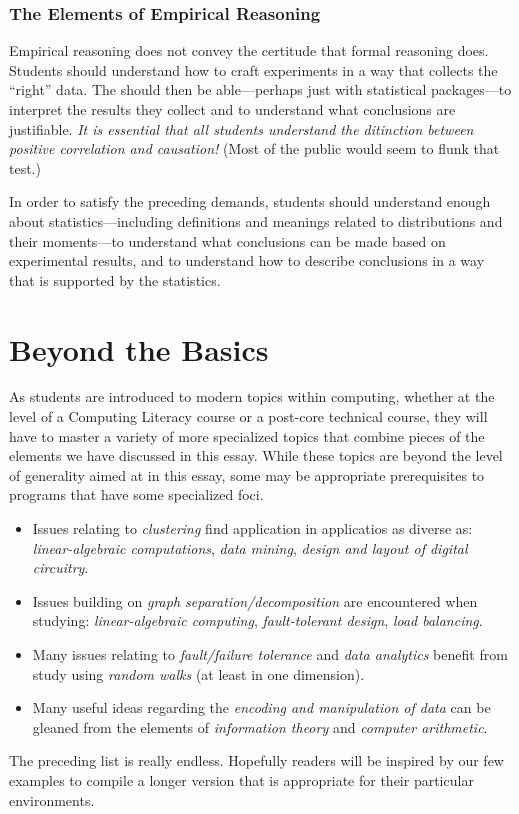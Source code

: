 \subsubsection{The Elements of Empirical Reasoning}

Empirical reasoning does not convey the certitude that formal
reasoning does.  Students should understand how to craft experiments
in a way that collects the ``right'' data.  The should then be
able---perhaps just with statistical packages---to interpret the
results they collect and to understand what conclusions are
justifiable.  {\em It is essential that all students understand the                  
  ditinction between {\em positive correlation} and {\em causation}!}
(Most of the public would seem to flunk that test.)

In order to satisfy the preceding demands, students should understand
enough about statistics---including definitions and meanings related
to distributions and their moments---to understand what conclusions
can be made based on experimental results, and to understand how to
describe conclusions in a way that is supported by the statistics.

\section{Beyond the Basics}

As students are introduced to modern topics within computing, whether
at the level of a Computing Literacy course or a post-core technical
course, they will have to master a variety of more specialized topics
that combine pieces of the elements we have discussed in this essay.
While these topics are beyond the level of generality aimed at in this
essay, some may be appropriate prerequisites to programs that have
some specialized foci.
\begin{itemize}
\item
Issues relating to {\em clustering} find application in applicatios as
diverse as: {\em linear-algebraic computations}, {\em data mining},
{\em design and layout of digital circuitry}.

\item
Issues building on {\em graph separation/decomposition} are
encountered when studying: {\em linear-algebraic computing}, {\em
  fault-tolerant design}, {\em load balancing}.

\item
Many issues relating to {\em fault/failure tolerance} and {\em data
  analytics} benefit from study using {\em random walks} (at least in
one dimension).

\item
Many useful ideas regarding the {\em encoding and manipulation of
  data} can be gleaned from the elements of {\em information theory}
and {\em computer arithmetic}.
\end{itemize}
The preceding list is really endless.  Hopefully readers will be
inspired by our few examples to compile a longer version that is
appropriate for their particular environments.




